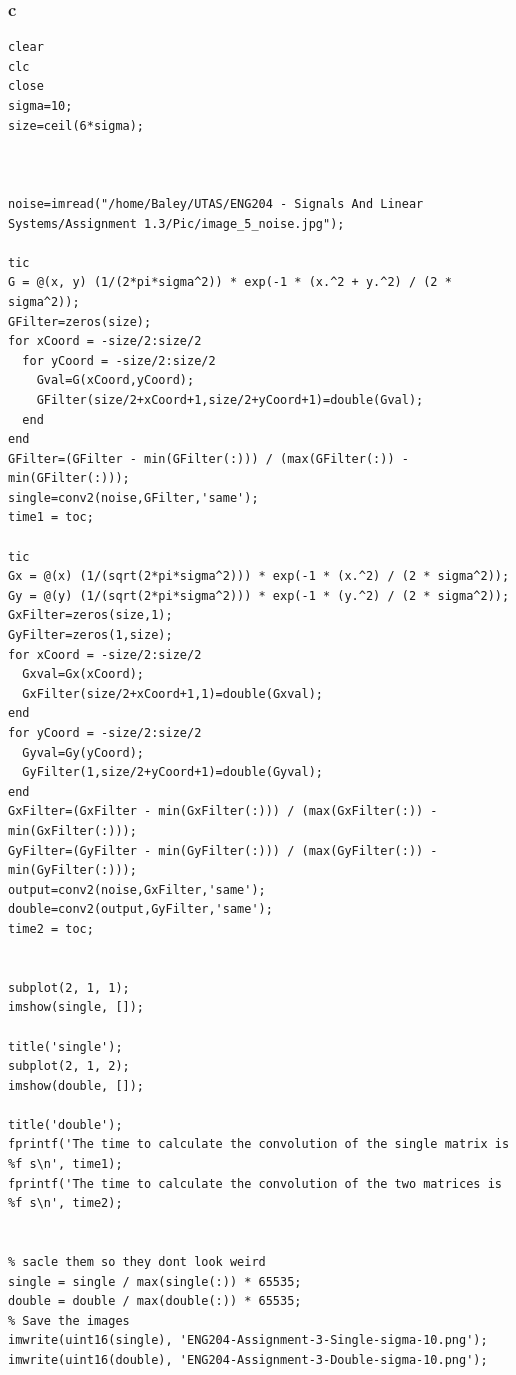 \documentclass[11pt]{article}
\begin{document}
\subsubsection{c}
\label{sec:org42444d1}
\begin{verbatim}
clear
clc
close
sigma=10;
size=ceil(6*sigma);



noise=imread("/home/Baley/UTAS/ENG204 - Signals And Linear Systems/Assignment 1.3/Pic/image_5_noise.jpg");

tic
G = @(x, y) (1/(2*pi*sigma^2)) * exp(-1 * (x.^2 + y.^2) / (2 * sigma^2));
GFilter=zeros(size);
for xCoord = -size/2:size/2
  for yCoord = -size/2:size/2
    Gval=G(xCoord,yCoord);
    GFilter(size/2+xCoord+1,size/2+yCoord+1)=double(Gval);
  end
end
GFilter=(GFilter - min(GFilter(:))) / (max(GFilter(:)) - min(GFilter(:)));
single=conv2(noise,GFilter,'same');
time1 = toc;

tic
Gx = @(x) (1/(sqrt(2*pi*sigma^2))) * exp(-1 * (x.^2) / (2 * sigma^2));
Gy = @(y) (1/(sqrt(2*pi*sigma^2))) * exp(-1 * (y.^2) / (2 * sigma^2));
GxFilter=zeros(size,1);
GyFilter=zeros(1,size);
for xCoord = -size/2:size/2
  Gxval=Gx(xCoord);
  GxFilter(size/2+xCoord+1,1)=double(Gxval);
end
for yCoord = -size/2:size/2
  Gyval=Gy(yCoord);
  GyFilter(1,size/2+yCoord+1)=double(Gyval);
end
GxFilter=(GxFilter - min(GxFilter(:))) / (max(GxFilter(:)) - min(GxFilter(:)));
GyFilter=(GyFilter - min(GyFilter(:))) / (max(GyFilter(:)) - min(GyFilter(:)));
output=conv2(noise,GxFilter,'same');
double=conv2(output,GyFilter,'same');
time2 = toc;


subplot(2, 1, 1);
imshow(single, []);

title('single');
subplot(2, 1, 2);
imshow(double, []);

title('double');
fprintf('The time to calculate the convolution of the single matrix is %f s\n', time1);
fprintf('The time to calculate the convolution of the two matrices is %f s\n', time2);


% sacle them so they dont look weird
single = single / max(single(:)) * 65535;
double = double / max(double(:)) * 65535;
% Save the images
imwrite(uint16(single), 'ENG204-Assignment-3-Single-sigma-10.png');
imwrite(uint16(double), 'ENG204-Assignment-3-Double-sigma-10.png');
\end{verbatim}
\end{document}
